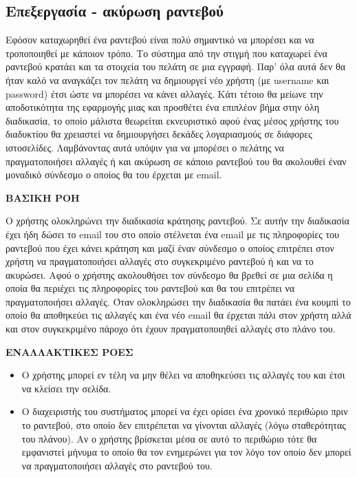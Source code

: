 \subsection{Επεξεργασία - ακύρωση ραντεβού}
Εφόσον καταχωρηθεί ένα ραντεβού είναι πολύ σημαντικό να μπορέσει και να τροποποιηθεί με κάποιον τρόπο. Το σύστημα από την στιγμή που καταχωρεί ένα ραντεβού κρατάει και τα στοιχεία του πελάτη σε μια εγγραφή. Παρ' όλα αυτά δεν θα ήταν καλό να αναγκάζει τον πελάτη να δημιουργεί νέο χρήστη (με username και password) έτσι ώστε να μπορέσει να κάνει αλλαγές. Κάτι τέτοιο θα μείωνε την αποδοτικότητα της εφαρμογής μιας και προσθέτει ένα επιπλέον βήμα στην όλη διαδικασία, το οποίο μάλιστα θεωρείται εκνευριστικό αφού ένας μέσος χρήστης του διαδυκτίου θα χρειαστεί να δημιουργήσει δεκάδες λογαριασμούς σε διάφορες ιστοσελίδες. Λαμβάνοντας αυτά υπόψιν για να μπορέσει ο πελάτης να πραγματοποιήσει αλλαγές ή και ακύρωση σε κάποιο ραντεβού του θα ακολουθεί έναν μοναδικό σύνδεσμο ο οποίος θα του έρχεται με email.

\textbf{ΒΑΣΙΚΗ ΡΟΗ}

Ο χρήστης ολοκληρώνει την διαδικασία κράτησης ραντεβού. Σε αυτήν την διαδικασία έχει ήδη δώσει το email του στο οποίο στέλνεται ένα email με τις πληροφορίες του ραντεβού που έχει κάνει κράτηση και μαζί έναν σύνδεσμο ο οποίος επιτρέπει στον χρήστη να πραγματοποιήσει αλλαγές στο συγκεκριμένο ραντεβού ή και να το ακυρώσει. Αφού ο χρήστης ακολουθήσει τον σύνδεσμο θα βρεθεί σε μια σελίδα η οποία θα περιέχει τις πληροφορίες του ραντεβού και θα του επιτρέπει να πραγματοποιήσει αλλαγές. Όταν ολοκληρώσει την διαδικασία θα πατάει ένα κουμπί το οποίο θα αποθηκεύει τις αλλαγές και ένα νέο email θα έρχεται πάλι στον χρήστη αλλά και στον συγκεκριμένο πάροχο ότι έχουν πραγματοποιηθεί αλλαγές στο πλάνο του.

\textbf{ΕΝΑΛΛΑΚΤΙΚΕΣ ΡΟΕΣ}

\begin{itemize}
\item Ο χρήστης μπορεί εν τέλη να μην θέλει να αποθηκεύσει τις αλλαγές του και έτσι να κλείσει την σελίδα.
\item Ο διαχειριστής του συστήματος μπορεί να έχει ορίσει ένα χρονικό περιθώριο πριν το ραντεβού, στο οποίο δεν επιτρέπεται να γίνονται αλλαγές (λόγω σταθερότητας του πλάνου). Αν ο χρήστης βρίσκεται μέσα σε αυτό το περιθώριο τότε θα εμφανιστεί μήνυμα το οποίο θα τον ενημερώνει για τον λόγο τον οποίο δεν μπορεί να πραγματοποιήσει αλλαγές στο ραντεβού του. 
\end{itemize}

